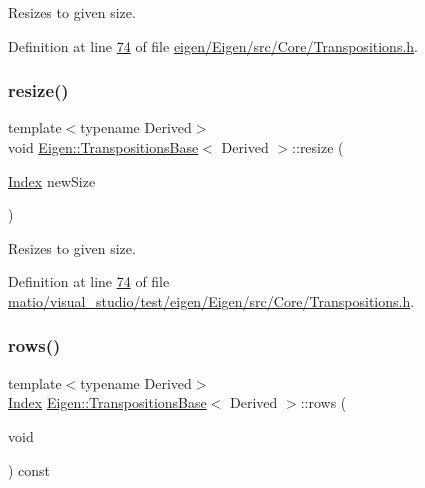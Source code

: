 Resizes to given size. 

Definition at line \hyperlink{eigen_2_eigen_2src_2_core_2_transpositions_8h_source_l00074}{74} of file \hyperlink{eigen_2_eigen_2src_2_core_2_transpositions_8h_source}{eigen/\+Eigen/src/\+Core/\+Transpositions.\+h}.

\mbox{\label{class_eigen_1_1_transpositions_base_a3dfa713d74fc1f9a7e589b3d428f7849}} 
\subsubsection{\texorpdfstring{resize()}{resize()}\hspace{0.1cm}{\footnotesize\ttfamily [2/2]}}
{\footnotesize\ttfamily template$<$typename Derived$>$ \\
void \hyperlink{class_eigen_1_1_transpositions_base}{Eigen\+::\+Transpositions\+Base}$<$ Derived $>$\+::resize (\begin{DoxyParamCaption}\item[{\hyperlink{class_eigen_1_1_transpositions_base_a3f5f06118b419e8e6ccbe49ed5b4c91f}{Index}}]{new\+Size }\end{DoxyParamCaption})\hspace{0.3cm}{\ttfamily [inline]}}

Resizes to given size. 

Definition at line \hyperlink{matio_2visual__studio_2test_2eigen_2_eigen_2src_2_core_2_transpositions_8h_source_l00074}{74} of file \hyperlink{matio_2visual__studio_2test_2eigen_2_eigen_2src_2_core_2_transpositions_8h_source}{matio/visual\+\_\+studio/test/eigen/\+Eigen/src/\+Core/\+Transpositions.\+h}.

\mbox{\label{class_eigen_1_1_transpositions_base_a8c073f17542a8fc9ac581c17f6cdc8d3}} 
\subsubsection{\texorpdfstring{rows()}{rows()}\hspace{0.1cm}{\footnotesize\ttfamily [1/2]}}
{\footnotesize\ttfamily template$<$typename Derived$>$ \\
\hyperlink{class_eigen_1_1_transpositions_base_a3f5f06118b419e8e6ccbe49ed5b4c91f}{Index} \hyperlink{class_eigen_1_1_transpositions_base}{Eigen\+::\+Transpositions\+Base}$<$ Derived $>$\+::rows (\begin{DoxyParamCaption}\item[{void}]{ }\end{DoxyParamCaption}) const\hspace{0.3cm}{\ttfamily [inline]}}

